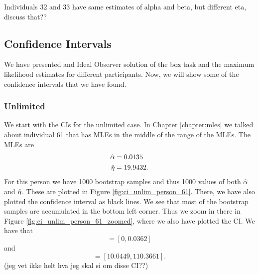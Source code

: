 Individuals 32 and 33 have same estimates of alpha and beta, but different eta, discuss that??











\subsection{Confidence Intervals}
We have presented and Ideal Observer solution of the box task and the maximum likelihood estimates for different participants. Now, we will show some of the confidence intervals that we have found. 

\subsubsection{Unlimited}
We start with the CIs for the unlimited case. In Chapter \ref{chapter:mles} we talked about individual 61 that has MLEs in the middle of the range of the MLEs. The MLEs are
\begin{equation*}
    \begin{aligned}
        \hat{\alpha} &= 0.0135\\
        \hat{\eta} &= 19.9432.
    \end{aligned}
\end{equation*}
For this person we have 1000 bootstrap samples and thus 1000 values of both $\hat{\alpha}$ and $\hat{\eta}$. These are plotted in Figure \ref{fig:ci_unlim_person_61}. There, we have also plotted the confidence interval as black lines. We see that most of the bootstrap samples are accumulated in the bottom left corner. Thus we zoom in there in Figure \ref{fig:ci_unlim_person_61_zoomed}, where we also have plotted the CI. We have that
\begin{equation*}
    [\hat{\alpha}^{*(5)}_{1000},\hat{\alpha}^{*(95)}_{1000}] = [0,0.0362]
\end{equation*}
and
\begin{equation*}
    [\hat{\eta}^{*(5)}_{1000},\hat{\eta}^{*(95)}_{1000}] = [10.0449,110.3661].
\end{equation*}
(jeg vet ikke helt hva jeg skal si om disse CI??)


